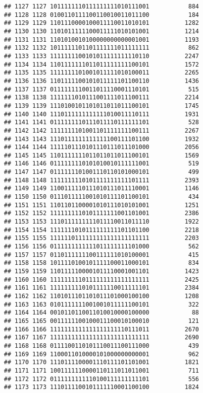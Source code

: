 \documentclass[]{article}
\begin{document}
\begin{verbatim}
## 1127 1127 1011111110111111111010111001           884
## 1128 1128 0100110111100110010011011100           184
## 1129 1129 1101110000100011110011010101          1282
## 1130 1130 1101011111100011111010101001          1214
## 1131 1131 1101010010100000000000001001          1193
## 1132 1132 1011111101101111111011111111           862
## 1133 1133 1111111100101011111111110110          2247
## 1134 1134 1101111111011011111111100101          1572
## 1135 1135 1111111101001011111010100011          2265
## 1136 1136 1101111100101011111101100110          1436
## 1137 1137 0111111110011011110001110101           515
## 1138 1138 1111111010111001111011100111          2214
## 1139 1139 1110100101101011011011100101          1745
## 1140 1140 1110111111111111010011110111          1931
## 1141 1141 0111111110111011110111111101           528
## 1142 1142 1111111101001101111111100111          2267
## 1143 1143 1110111111111111100111101100          1932
## 1144 1144 1111101110101110111011101000          2056
## 1145 1145 1101111111011011011011100101          1569
## 1146 1146 0111111110101010010111111001           519
## 1147 1147 0111111101001110110101000101           499
## 1148 1148 1111111110101111111111101111          2393
## 1149 1149 1100111110111010111011110001          1146
## 1150 1150 0111011111001010111101100101           434
## 1151 1151 1101101100001010111010101001          1251
## 1152 1152 1111111110101111111001101001          2386
## 1153 1153 1110111111111011110011011110          1922
## 1154 1154 1111111010111111111101101100          2218
## 1155 1155 1111110111111111111111111111          2203
## 1156 1156 0111111111111011111111101000           562
## 1157 1157 0110111111100111111010100001           415
## 1158 1158 1011110100101111100011000101           834
## 1159 1159 1101111100001011110001001101          1423
## 1160 1160 1111111110111111111111111111          2425
## 1161 1161 1111111110101111110011111101          2384
## 1162 1162 1101011101101011101000100100          1208
## 1163 1163 0101111111001001011111100101           322
## 1164 1164 0010110110011010010000100000            88
## 1165 1165 0011111100100011100010100010           121
## 1166 1166 1111111111111111111110111011          2670
## 1167 1167 1111111111111111111111111111          2690
## 1168 1168 0111100110101110011100111000           439
## 1169 1169 1100011010000101000000000001           962
## 1170 1170 1110111100001110111101101001          1821
## 1171 1171 1001111110000110111011011001           711
## 1172 1172 0111111111110100111111111101           556
## 1173 1173 1110111100101111110001100100          1824

\end{verbatim}
\end{document}
